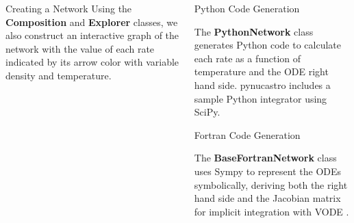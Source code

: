 \documentclass[final]{beamer}
\newlength{\onecolwid}
\newlength{\twocolwid}
\newcommand{\isotm}[2]{{}^{#2}\mathrm{#1}}
\begin{document}
\begin{frame}[t]
\begin{columns}[t]
\begin{column}{\twocolwid}
\begin{columns}[t,totalwidth=\twocolwid]
\begin{column}{\onecolwid}
\begin{block}{Creating a Network}
Using the \textbf{Composition} and \textbf{Explorer} classes, we also
construct an interactive graph of the network with the value of each
rate indicated by its arrow color with variable density and temperature.

\end{block}


\end{column} %

\begin{column}{\onecolwid}\vspace{-.6in} %


  
\begin{block}{Python Code Generation}

The \textbf{PythonNetwork} class generates Python code to calculate
each rate as a function of temperature and the ODE right hand
side. pynucastro includes a sample Python integrator using SciPy.


\end{block}


\begin{block}{Fortran Code Generation}

The \textbf{BaseFortranNetwork} class uses Sympy \cite{SymPy.2017} to
represent the ODEs symbolically, deriving both the right
hand side and the Jacobian matrix for implicit integration with VODE \cite{VODE.1989}.


\end{block}
\end{column}
\end{columns}
\end{column}
\end{columns}
\end{frame}
\end{document}
